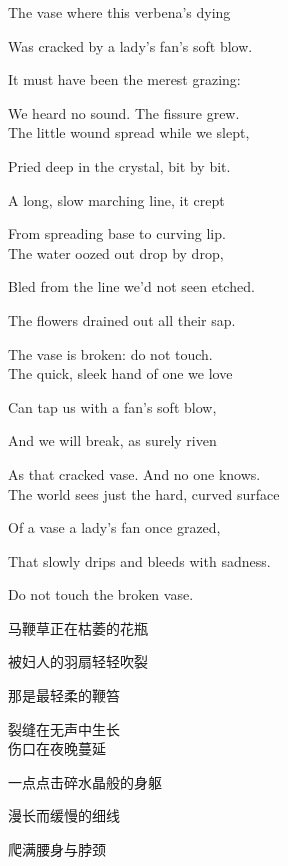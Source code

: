 \begin{multicols}{2}
The vase where this verbena’s dying          \par
Was cracked by a lady’s fan’s soft blow.     \par
It must have been the merest grazing:        \par
We heard no sound. The fissure grew.         \\

The little wound spread while we slept,      \par
Pried deep in the crystal, bit by bit.       \par
A long, slow marching line, it crept         \par
From spreading base to curving lip.          \\

The water oozed out drop by drop,            \par
Bled from the line we’d not seen etched.     \par
The flowers drained out all their sap.       \par
The vase is broken: do not touch.            \\

The quick, sleek hand of one we love         \par
Can tap us with a fan’s soft blow,           \par
And we will break, as surely riven           \par
As that cracked vase. And no one knows.      \\

The world sees just the hard, curved surface \par
Of a vase a lady’s fan once grazed,          \par
That slowly drips and bleeds with sadness.   \par
Do not touch the broken vase.

马鞭草正在枯萎的花瓶       \par
被妇人的羽扇轻轻吹裂       \par
那是最轻柔的鞭笞          \par
裂缝在无声中生长          \\

伤口在夜晚蔓延            \par
一点点击碎水晶般的身躯     \par
漫长而缓慢的细线          \par
爬满腰身与脖颈            \\


\end{multicols}
